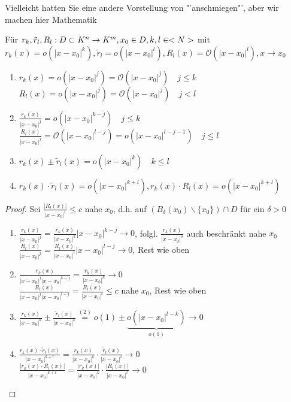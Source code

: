 \smiley{} Vielleicht hatten Sie eine andere Vorstellung von "'anschmiegen"', aber wir machen hier 
Mathematik \smiley{}

\begin{proposition}
	Für $r_k,\tilde{r}_l,R_l:D\subset K^n\to K^m,x_0\in D,k,l\in<N>$ mit \\
	$r_k(x)=o(\vert x-x_0\vert^k),\tilde{r}_l=o(\vert x-x_0\vert^l),R_l(x)=\mathcal{O}(\vert x-x_0\vert ^l),x\to x_0$
	\begin{enumerate}
		\item $r_k(x)=o(\vert x-x_0\vert^j)=\mathcal{O}(\vert x-x_0\vert^j)\quad j\le k$ \\
		$R_l(x)=o(\vert x-x_0\vert^j)=\mathcal{O}(\vert x-x_0\vert^j)\quad j<l$
		\item $\frac{r_k(x)}{\vert x-x_0\vert^j}=o(\vert x-x_0\vert^{k-j})\quad j\le k$ \\
		$\frac{R_l(x)}{\vert x-x_0\vert^j}=\mathcal{O}(\vert x-x_0\vert^{l-j})=o(\vert x-x_0\vert^{l-j-1})\quad j\le l$
		\item $r_k(x)\pm \tilde{r}_l(x)=o(\vert x-x_0\vert ^k)\quad k\le l$
		\item $r_k(x)\cdot \tilde{r}_l(x)=o(\vert x-x_0\vert^{k+l}),r_k(x)\cdot R_l(x)=o(\vert x-x_0\vert^{k+l})$
	\end{enumerate}
\end{proposition}
\begin{proof}
	Sei $\frac{\vert R_l(x)\vert}{\vert x-x_0\vert^l}\le c$ nahe $x_0$, d.h. auf $(B_{\delta}(x_0)\backslash\{x_0\})\cap D$ für ein $\delta>0$
	\begin{enumerate}
		\item $\frac{r_k(x)}{\vert x-x_0\vert^j}=\frac{r_k(x)}{\vert x-x_0\vert^k}\vert x-x_0\vert^{k-j}\to 0$, folgl. $\frac{r_k(x)}{\vert x-x_0\vert^{\delta}}$ auch beschränkt nahe $x_0$ \\
		$\frac{R_l(x)}{\vert  x-x_0\vert^j}=\frac{R_l(x)}{\vert x-x_0\vert^l}\vert x-x_0\vert^{l-j}\to 0$, Rest wie oben
		\item $\frac{r_k(x)}{\vert x-x_0\vert^j \vert x-x_0\vert^{k-j}}=\frac{r_k(x)}{\vert x-x_0\vert^k}\to 0$ \\
		$\frac{R_l(x)}{\vert x-x_0\vert^j \vert x-x_0\vert^{l-j}}=\frac{R_l(x)}{\vert x-x_0\vert^l}\le c$ nahe $x_0$, Rest wie oben
		\item $\frac{r_k(x)}{\vert x-x_0\vert^k}\pm\frac{\tilde{r}_l(x)}{\vert x-x_0\vert^k}\overset{(2)}{=}o(1)\pm\underbrace{o(\vert x-x_0\vert^{l-k})}_{o(1)}\to 0$
		\item $\frac{r_k(x)\cdot \tilde{r}_l(x)}{\vert x-x_0\vert^{k+l}}=\frac{r_k(x)}{\vert x-x_0\vert^k}\cdot\frac{\tilde{r}_l(x)}{\vert x-x_0\vert^l}\to 0$ \\
		$\frac{\vert r_k(x)\cdot R_l(x)\vert}{\vert x-x_0\vert^{k+l}}=\frac{\vert r_k(x)\vert}{\vert x-x_0\vert^k}\cdot\frac{\vert R_l(x)\vert}{\vert x-x_0\vert^l}\to 0$
	\end{enumerate}
\end{proof}